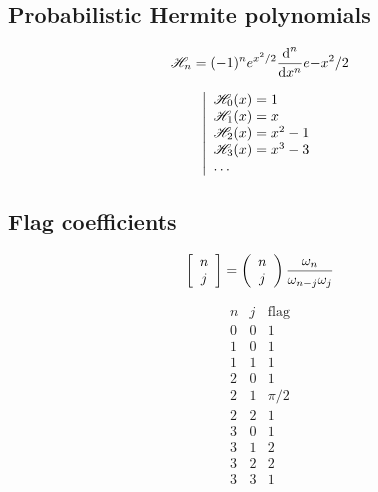 \documentclass[12pt]{article}
\begin{document}
\subsection{Probabilistic Hermite polynomials}
\begin{minipage}{0.5\linewidth}
\begin{equation}\mathscr{H}_n=(-1)^n e^{x^2/2} \frac{\text{d}^n}{\text{d}x^n}e{-x^2/2}\end{equation}
\end{minipage}
\begin{minipage}{0.5\linewidth}
\begin{equation}
  \left|
  \begin{array}{l}
    \mathscr{H}_0(x)=1 \\
    \mathscr{H}_1(x)=x \\
    \mathscr{H}_2(x)=x^2-1 \\
    \mathscr{H}_3(x)=x^3-3 \\
    \dots
  \end{array}
  \right.
\end{equation}
\end{minipage}

\subsection{Flag coefficients}
\begin{minipage}{0.5\linewidth}
\begin{equation}
  \left[ \begin{array}{c} n \\ j \end{array} \right] = 
  \left( \begin{array}{c} n \\ j \end{array} \right)\frac{\omega_n}{\omega_{n-j}\omega_j}
\end{equation}
\end{minipage}
\begin{minipage}{0.5\linewidth}
\begin{equation}
  \begin{array}{c|c|c}
    n & j & \text{flag} \\
    \hline
    0 & 0 & 1\\
    1 & 0 & 1\\
    1 & 1 & 1\\
    2 & 0 & 1\\
    2 & 1 & \pi/2\\
    2 & 2 & 1\\
    3 & 0 & 1\\
    3 & 1 & 2\\
    3 & 2 & 2\\
    3 & 3 & 1
  \end{array}
\end{equation}
\end{minipage}
\end{document}
